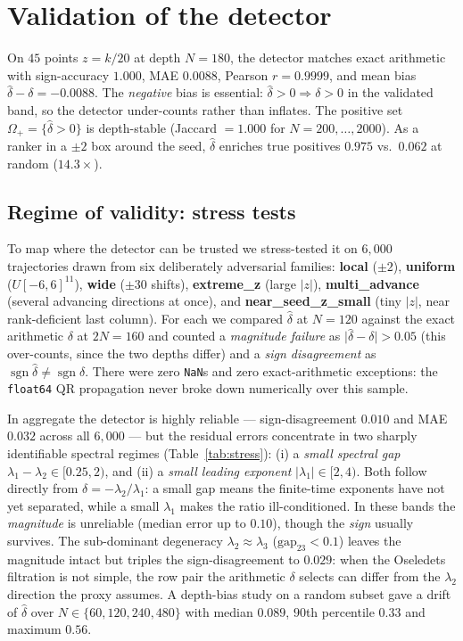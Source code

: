\documentclass[11pt,a4paper]{article}
\theoremstyle{definition}
\newcommand{\dhat}{\hat{\delta}}
\begin{document}
\section{Validation of the detector}
\label{sec:valid}
On $45$ points $z=k/20$ at depth $N=180$, the detector matches exact arithmetic with
sign-accuracy $1.000$, MAE $0.0088$, Pearson $r=0.9999$, and mean bias
$\dhat-\delta = -0.0088$. The \emph{negative} bias is essential: $\dhat>0\Rightarrow\delta>0$
in the validated band, so the detector under-counts rather than inflates. The positive set
$\Omega_+=\{\dhat>0\}$ is depth-stable (Jaccard $=1.000$ for $N=200,\dots,2000$). As a ranker
in a $\pm2$ box around the seed, $\dhat$ enriches true positives $0.975$ vs.\ $0.062$ at
random ($14.3\times$).

\subsection{Regime of validity: stress tests}
\label{sec:stress}
To map where the detector can be trusted we stress-tested it on $6{,}000$ trajectories drawn
from six deliberately adversarial families: \textbf{local} ($\pm2$), \textbf{uniform}
($U[-6,6]^{11}$), \textbf{wide} ($\pm30$ shifts), \textbf{extreme\_z} (large $|z|$),
\textbf{multi\_advance} (several advancing directions at once), and
\textbf{near\_seed\_z\_small} (tiny $|z|$, near rank-deficient last column). For each we
compared $\dhat$ at $N=120$ against the exact arithmetic $\delta$ at $2N=160$ and counted a
\emph{magnitude failure} as $\lvert\dhat-\delta\rvert>0.05$ (this over-counts, since the two
depths differ) and a \emph{sign disagreement} as $\operatorname{sgn}\dhat\neq
\operatorname{sgn}\delta$. There were zero \texttt{NaN}s and zero exact-arithmetic exceptions:
the \texttt{float64} QR propagation never broke down numerically over this sample.

In aggregate the detector is highly reliable --- sign-disagreement $0.010$ and MAE $0.032$
across all $6{,}000$ --- but the residual errors concentrate in two sharply identifiable
spectral regimes (Table~\ref{tab:stress}): (i) a \emph{small spectral gap}
$\lambda_1-\lambda_2\in[0.25,2)$, and (ii) a \emph{small leading exponent}
$|\lambda_1|\in[2,4)$. Both follow directly from $\delta=-\lambda_2/\lambda_1$: a small gap
means the finite-time exponents have not yet separated, while a small $\lambda_1$ makes the
ratio ill-conditioned. In these bands the \emph{magnitude} is unreliable (median error up to
$0.10$), though the \emph{sign} usually survives. The sub-dominant degeneracy
$\lambda_2\approx\lambda_3$ ($\mathrm{gap}_{23}<0.1$) leaves the magnitude intact but triples
the sign-disagreement to $0.029$: when the Oseledets filtration is not simple, the row pair the
arithmetic $\delta$ selects can differ from the $\lambda_2$ direction the proxy assumes. A
depth-bias study on a random subset gave a drift of $\dhat$ over $N\in\{60,120,240,480\}$ with
median $0.089$, $90$th percentile $0.33$ and maximum $0.56$.
\end{document}
